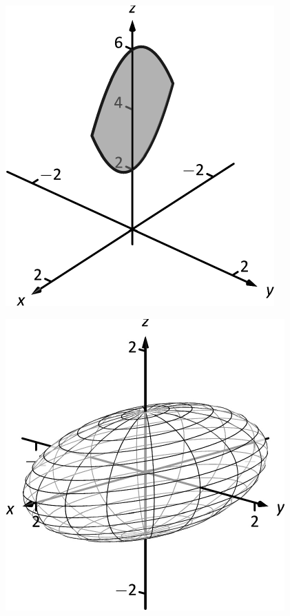 \documentclass[10pt]{article}
\begin{document}
\includegraphics{figtrip5e_3DBW.pdf}
\texttt{}

\includegraphics{figtripintro_3DBW.pdf}
\texttt{}
\end{document}
